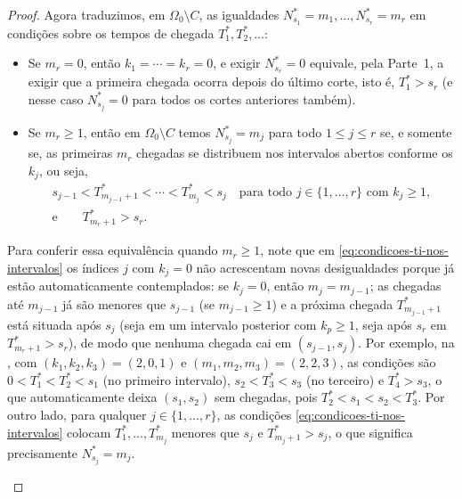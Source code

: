 \documentclass[12pt,portuguese]{article}
\theoremstyle{definition}
\theoremstyle{plainexercise}
\theoremstyle{starredexercise}
\theoremstyle{definition}
\begin{document}
\begin{proof}
Agora traduzimos, em $\Omega_0\setminus C$, as igualdades
$N_{s_1}^*=m_1,\ldots,N_{s_r}^*=m_r$ em condições sobre os tempos de chegada
$T_1^*,T_2^*,\ldots$:
\begin{itemize}
  \item Se $m_r=0$, então $k_1=\cdots=k_r=0$, e exigir $N_{s_r}^*=0$ equivale,
        pela Parte~1, a exigir que a primeira chegada ocorra depois do último
        corte, isto é, $T_1^*>s_r$ (e nesse caso $N_{s_j}^*=0$ para todos os
        cortes anteriores também).
  \item Se $m_r\geqslant1$, então em $\Omega_0\setminus C$ temos $N_{s_j}^*=m_j$
        para todo $1\leqslant j\leqslant r$ se, e somente se, as primeiras $m_r$
        chegadas se distribuem nos intervalos abertos conforme os $k_j$, ou seja,
        \begin{equation}\label{eq:condicoes-ti-nos-intervalos}
          \begin{gathered}
            s_{j-1}<T_{m_{j-1}+1}^*<\cdots<T_{m_j}^*<s_j
            \quad\text{para todo } j\in\{1,\ldots,r\}\text{ com }k_j\geqslant1,
            \\[0.2cm]
            \text{e}\qquad T_{m_r+1}^*>s_r.
          \end{gathered}
        \end{equation}
\end{itemize}
Para conferir essa equivalência quando $m_r\geqslant1$, note que em
\eqref{eq:condicoes-ti-nos-intervalos} os índices $j$ com $k_j=0$ não
acrescentam novas desigualdades porque já estão automaticamente contemplados: se
$k_j=0$, então $m_j=m_{j-1}$; as chegadas até $m_{j-1}$ já são menores que
$s_{j-1}$ (se $m_{j-1}\geqslant1$) e a próxima chegada $T_{m_{j-1}+1}^*$ está
situada após $s_j$ (seja em um intervalo posterior com $k_p\geqslant1$, seja
após $s_r$ em $T_{m_r+1}^*>s_r$), de modo que nenhuma chegada cai em
$(s_{j-1},s_j)$. Por exemplo, na , com
$(k_1,k_2,k_3)=(2,0,1)$ e $(m_1,m_2,m_3)=(2,2,3)$, as condições são
$0<T_1^*<T_2^*<s_1$ (no primeiro intervalo), $s_2<T_3^*<s_3$ (no terceiro) e
$T_4^*>s_3$, o que automaticamente deixa $(s_1,s_2)$ sem chegadas, pois
$T_2^*<s_1<s_2<T_3^*$. Por outro lado, para qualquer $j\in\{1,\ldots,r\}$, as
condições \eqref{eq:condicoes-ti-nos-intervalos} colocam $T_1^*,\ldots,T_{m_j}^*$
menores que $s_j$ e $T_{m_j+1}^*>s_j$, o que significa precisamente
$N_{s_j}^*=m_j$.

\begin{figure}[H]
  \centering
\end{figure}
\end{proof}
\end{document}
